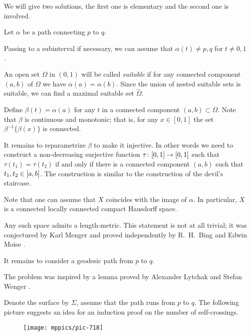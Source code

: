 We will give two solutions, the first one is elementary and the second one is involved. 

Let $\alpha$ be a path connecting $p$ to $q$.

Passing to a subinterval if necessary,
we can assume that $\alpha(t)\ne p,q$ for $t\ne0,1$.

An open set $\Omega$ in $(0,1)$ will be called {}\emph{suitable}
if for any connected component $(a,b)$ of $\Omega$ we have $\alpha(a)=\alpha(b)$.
Since the union of nested suitable sets is suitable, we can find a maximal suitable set $\hat \Omega$.

Define $\beta(t)=\alpha(a)$ for any $t$ in a connected component $(a,b)\subset\Omega$.
Note that $\beta$ is continuous and monotonic;
that is, for any $x\in [0,1]$ the set $\beta^{-1}\{\beta(x)\}$ is connected.

It remains to reparametrize $\beta$ to make it injective.
In other words we need to construct a non-decreasing surjective function $\tau\:[0,1]\z\to[0,1]$ such that 
$\tau(t_1)=\tau(t_2)$ if and only if there is a connected component $(a,b)$ such that $t_1,t_2\z\in [a,b]$.
The construction is similar to the construction of the devil's staircase.
\qeds

Note that one can assume that $X$ coincides with the image of $\alpha$.
In particular, $X$ is a connected locally connected compact Hausdorff space.

Any such space admits a length-metric.
This statement is not at all trivial;
it was conjectured by Karl Menger \cite{menger}
and proved independently 
by R.~H.~Bing  \cite{bing-length-0, bing-length-1} 
and Edwin Moise \cite{moise}.

It remains to consider a geodesic path from $p$ to $q$.
\qeds

The problem was inspired by a lemma 
proved by 
Alexander Lytchak
and Stefan Wenger \cite[see 7.13 in][]{lytchak-wenger}.


Denote the surface by $\Sigma$, assume that the path runs from $p$ to $q$.
The following picture suggests an idea for an induction proof on the number of self-crossings.

\begin{figure}[!ht]
\vskip0mm
\centering
\texttt{[image: mppics/pic-718]}
\end{figure}

